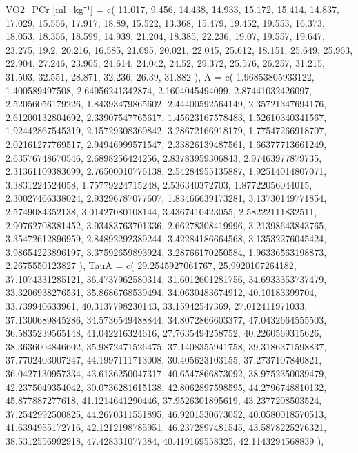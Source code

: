 \documentclass[
  letterpaper,
  DIV=11]{scrartcl}
\newenvironment{Shaded}{\begin{snugshade}}{\end{snugshade}}
\newcommand{\NormalTok}[1]{\textcolor[rgb]{0.00,0.23,0.31}{#1}}
\begin{document}
\begin{Shaded}
\begin{Highlighting}[]
\NormalTok{  \textasciigrave{}VO2\_PCr [ml·kg⁻¹]\textasciigrave{} = c( 11.017, 9.456, 14.438, 14.933, 15.172, 15.414, 14.837, 17.029, 15.556, 17.917, 18.89, 15.522, 13.368, 15.479, 19.452, 19.553, 16.373, 18.053, 18.356, 18.599, 14.939, 21.204, 18.385, 22.236, 19.07, 19.557, 19.647, 23.275, 19.2, 20.216, 16.585, 21.095, 20.021, 22.045, 25.612, 18.151, 25.649, 25.963, 22.904, 27.246, 23.905, 24.614, 24.042, 24.52, 29.372, 25.576, 26.257, 31.215, 31.503, 32.551, 28.871, 32.236, 26.39, 31.882 ),}
\NormalTok{  \textasciigrave{}A\textasciigrave{} = c( 1.96853805933122, 1.400589497508, 2.64956241342874, 2.1604045494099, 2.87441032426097, 2.52056056179226, 1.84393479865602, 2.44400592564149, 2.35721347694176, 2.61200132804692, 2.33907547765617, 1.45623167578483, 1.52610340341567, 1.92442867545319, 2.15729308369842, 3.28672166918179, 1.77547266918707, 2.02161277769517, 2.94946999571547, 2.33826139487561, 1.66377713661249, 2.63576748670546, 2.6898256424256, 2.83783959306843, 2.97463977879735, 2.31361109383699, 2.76500010776138, 2.54284955135887, 1.92514014807071, 3.3831224524058, 1.75779224715248, 2.536340372703, 1.87722056044015, 2.30027466338024, 2.93296787077607, 1.83466639173281, 3.13730149771854, 2.5749084352138, 3.01427080108144, 3.4367410423055, 2.58222111832511, 2.90762708381452, 3.93483763701336, 2.66278308419996, 3.21398643843765, 3.35472612896959, 2.84892292389244, 3.42284186664568, 3.13532276045424, 3.98654223896197, 3.37592659893924, 3.28766170250584, 1.96336563198873, 2.2675550123827 ),}
\NormalTok{  \textasciigrave{}TauA\textasciigrave{} = c( 29.2545927061767, 25.9920107264182, 37.1074331285121, 36.4737962580314, 31.6012601281756, 34.6933353737479, 33.3206938276531, 35.8686768539494, 34.0630483674912, 40.10183399704, 33.739940633961, 40.3137798230143, 33.15942547369, 27.012411971033, 37.1300689845286, 34.5736549488844, 34.8072866603377, 47.0432664555503, 36.5835239565148, 41.042216324616, 27.7635494258752, 40.2260569315626, 38.3636004846602, 35.9872471526475, 37.1408355941758, 39.3186371598837, 37.7702403007247, 44.1997111713008, 30.405623103155, 37.2737107840821, 36.0427130957334, 43.6136250047317, 40.6547866873092, 38.9752350039479, 42.2375049354042, 30.0736281615138, 42.8062897598595, 44.2796748810132, 45.877887277618, 41.1214641290446, 37.9526301895619, 43.2377208503524, 37.2542992500825, 44.2670311551895, 46.9201530673052, 40.0580018570513, 41.6394955172716, 42.1212198785951, 46.2372897481545, 43.5878225276321, 38.5312556992918, 47.428331077384, 40.419169558325, 42.1143294568839 ),}

\end{Highlighting}
\end{Shaded}
\end{document}

